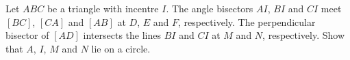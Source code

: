 Let $ABC$ be a triangle with incentre $I$. The angle bisectors $AI$,  $BI$ and $CI$ meet $[BC]$,  $[CA]$ and $[AB]$ at $D$,  $E$ and $F$,  respectively. The perpendicular bisector of $[AD]$ intersects the lines $BI$ and $CI$ at $M$ and $N$,  respectively. Show that $A$,  $I$,  $M$ and $N$ lie on a circle.